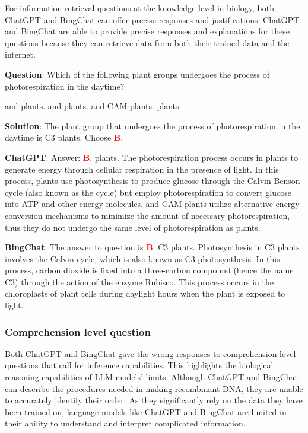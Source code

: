 \documentclass{article}
\begin{document}
{	For information retrieval questions at the knowledge level in biology, both ChatGPT and BingChat can offer precise responses and justifications. ChatGPT and BingChat are able to provide precise responses and explanations for these questions because they can retrieve data from both their trained data and the internet.
	
	
	\begin{mdframed}[linewidth=1pt,linecolor=red] \textbf{Question}: Which of the following plant groups undergoes the process of photorespiration in the daytime?
		
		\begin{oneparchoices}
			\choice  and  plants.
			\choice  and  plants.
			\choice  and CAM plants.
			\choice  plants.
		\end{oneparchoices}
		
		\textbf{Solution}: The plant group that undergoes the process of photorespiration in the daytime is C3 plants. Choose \textcolor{red}{\textbf{B}}. 
		
		\textbf{ChatGPT}: Answer: \textcolor{red}{\textbf{B}}.  plants. The photorespiration process occurs in plants to generate energy through cellular respiration in the presence of light. In this process,  plants use photosynthesis to produce glucose through the Calvin-Benson cycle (also known as the  cycle) but employ photorespiration to convert glucose into ATP and other energy molecules.  and CAM plants utilize alternative energy conversion mechanisms to minimize the amount of necessary photorespiration, thus they do not undergo the same level of photorespiration as  plants.
		
		\textbf{BingChat}: The answer to question is \textcolor{red}{\textbf{B}}. C3 plants. Photosynthesis in C3 plants involves the Calvin cycle, which is also known as C3 photosynthesis. In this process, carbon dioxide is fixed into a three-carbon compound (hence the name C3) through the action of the enzyme Rubisco. This process occurs in the chloroplasts of plant cells during daylight hours when the plant is exposed to light.
		
	\end{mdframed}	
	
	\subsubsection{Comprehension level question}
	\label{VNHSGE_Bio_C}
	
	Both ChatGPT and BingChat gave the wrong responses to comprehension-level questions that call for inference capabilities. This highlights the biological reasoning capabilities of LLM models' limits. Although ChatGPT and BingChat can describe the procedures needed in making recombinant DNA, they are unable to accurately identify their order. As they significantly rely on the data they have been trained on, language models like ChatGPT and BingChat are limited in their ability to understand and interpret complicated information.
	
}
\end{document}

